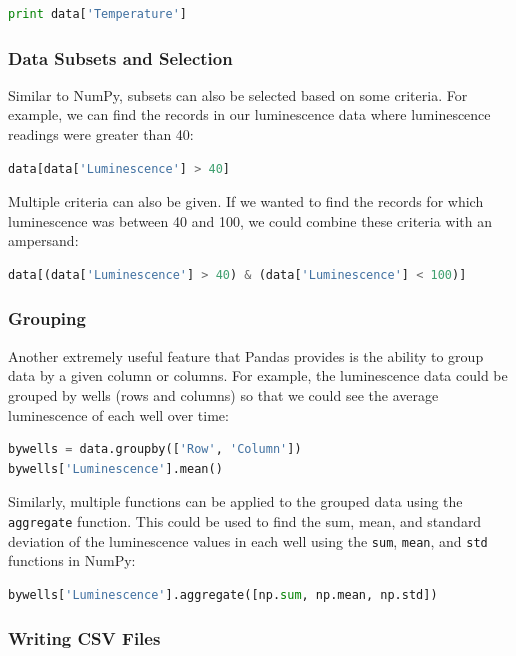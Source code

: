 \begin{lstlisting}[language=Python]
print data['Temperature']
\end{lstlisting}
\subsubsection{Data Subsets and Selection}

Similar to NumPy, subsets can also be selected based on some criteria.
For example, we can find the records in our luminescence data where
luminescence readings were greater than 40:

\begin{lstlisting}[language=Python]
data[data['Luminescence'] > 40]
\end{lstlisting}
Multiple criteria can also be given. If we wanted to find the records
for which luminescence was between 40 and 100, we could combine these
criteria with an ampersand:

\begin{lstlisting}[language=Python]
data[(data['Luminescence'] > 40) & (data['Luminescence'] < 100)]
\end{lstlisting}
\subsubsection{Grouping}

Another extremely useful feature that Pandas provides is the ability to
group data by a given column or columns. For example, the luminescence
data could be grouped by wells (rows and columns) so that we could see
the average luminescence of each well over time:

\begin{lstlisting}[language=Python]
bywells = data.groupby(['Row', 'Column'])
bywells['Luminescence'].mean()
\end{lstlisting}
Similarly, multiple functions can be applied to the grouped data using
the \lstinline!aggregate! function. This could be used to find the sum,
mean, and standard deviation of the luminescence values in each well
using the \lstinline!sum!, \lstinline!mean!, and \lstinline!std!
functions in NumPy:

\begin{lstlisting}[language=Python]
bywells['Luminescence'].aggregate([np.sum, np.mean, np.std])
\end{lstlisting}
\subsubsection{Writing CSV Files}

